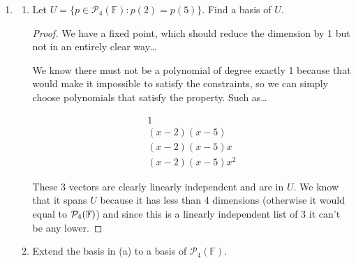 \begin{enumerate}
\begin{enumerate}
            \begin{proof}
                We can simply add the constant, 1. This is now a linearly independent list which has length $\dim \mathcal P_4(\F)$, so it is a basis.
            \end{proof}
            \item Find a subspace $W$ of $\mathcal{P}_4(\mathbb{F})$ such that $\mathcal{P}_4(\mathbb{F}) = U \oplus W$.
            
            \begin{proof}
                It is just the subspace given by the span of the additional vector, in this case 

                $$W = \{a : a \in \F\}$$
            \end{proof}
        \end{enumerate}


        \item[5]
            \begin{enumerate}
                \item Let $U = \{p \in \mathcal{P}_4(\mathbb{F}) : p(2) = p(5)\}$. Find a basis of $U$.
                
                \begin{proof}
                    We have a fixed point, which should reduce the dimension by 1 but not in an entirely clear way\dots

                    We know there must not be a polynomial of degree exactly 1 because that would make it impossible to satisfy the constraints, so we can simply choose polynomials that satisfy the property. Such as\dots

                    \begin{align*}
                        1 \\
                        (x-2)(x-5) \\
                        (x-2)(x-5)x \\
                        (x-2)(x-5)x^2
                    \end{align*}

                    These 3 vectors are clearly linearly independent and are in $U$. We know that it spans $U$ because it has less than 4 dimensions (otherwise it would equal to $\mathcal P_4(\mathbb{F})$) and since this is a linearly independent list of 3 it can't be any lower.
                \end{proof}
                \item Extend the basis in (a) to a basis of $\mathcal{P}_4(\mathbb{F})$.
                

\end{enumerate}
\end{enumerate}
